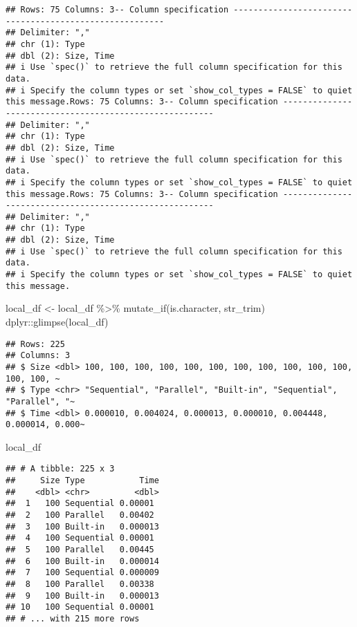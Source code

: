 \documentclass[
]{article}
\newenvironment{Shaded}{\begin{snugshade}}{\end{snugshade}}
\newcommand{\FunctionTok}[1]{\textcolor[rgb]{0.00,0.00,0.00}{#1}}
\newcommand{\NormalTok}[1]{#1}
\newcommand{\OtherTok}[1]{\textcolor[rgb]{0.56,0.35,0.01}{#1}}
\newcommand{\SpecialCharTok}[1]{\textcolor[rgb]{0.00,0.00,0.00}{#1}}
\begin{document}
\begin{verbatim}
## Rows: 75 Columns: 3-- Column specification --------------------------------------------------------
## Delimiter: ","
## chr (1): Type
## dbl (2): Size, Time
## i Use `spec()` to retrieve the full column specification for this data.
## i Specify the column types or set `show_col_types = FALSE` to quiet this message.Rows: 75 Columns: 3-- Column specification --------------------------------------------------------
## Delimiter: ","
## chr (1): Type
## dbl (2): Size, Time
## i Use `spec()` to retrieve the full column specification for this data.
## i Specify the column types or set `show_col_types = FALSE` to quiet this message.Rows: 75 Columns: 3-- Column specification --------------------------------------------------------
## Delimiter: ","
## chr (1): Type
## dbl (2): Size, Time
## i Use `spec()` to retrieve the full column specification for this data.
## i Specify the column types or set `show_col_types = FALSE` to quiet this message.
\end{verbatim}

\begin{Shaded}
\begin{Highlighting}[]
\NormalTok{local\_df }\OtherTok{\textless{}{-}}\NormalTok{ local\_df }\SpecialCharTok{\%\textgreater{}\%} \FunctionTok{mutate\_if}\NormalTok{(is.character, str\_trim)}
\NormalTok{dplyr}\SpecialCharTok{::}\FunctionTok{glimpse}\NormalTok{(local\_df)}
\end{Highlighting}
\end{Shaded}

\begin{verbatim}
## Rows: 225
## Columns: 3
## $ Size <dbl> 100, 100, 100, 100, 100, 100, 100, 100, 100, 100, 100, 100, 100, ~
## $ Type <chr> "Sequential", "Parallel", "Built-in", "Sequential", "Parallel", "~
## $ Time <dbl> 0.000010, 0.004024, 0.000013, 0.000010, 0.004448, 0.000014, 0.000~
\end{verbatim}

\begin{Shaded}
\begin{Highlighting}[]
\NormalTok{local\_df}
\end{Highlighting}
\end{Shaded}

\begin{verbatim}
## # A tibble: 225 x 3
##     Size Type           Time
##    <dbl> <chr>         <dbl>
##  1   100 Sequential 0.00001 
##  2   100 Parallel   0.00402 
##  3   100 Built-in   0.000013
##  4   100 Sequential 0.00001 
##  5   100 Parallel   0.00445 
##  6   100 Built-in   0.000014
##  7   100 Sequential 0.000009
##  8   100 Parallel   0.00338 
##  9   100 Built-in   0.000013
## 10   100 Sequential 0.00001 
## # ... with 215 more rows
\end{verbatim}
\end{document}
